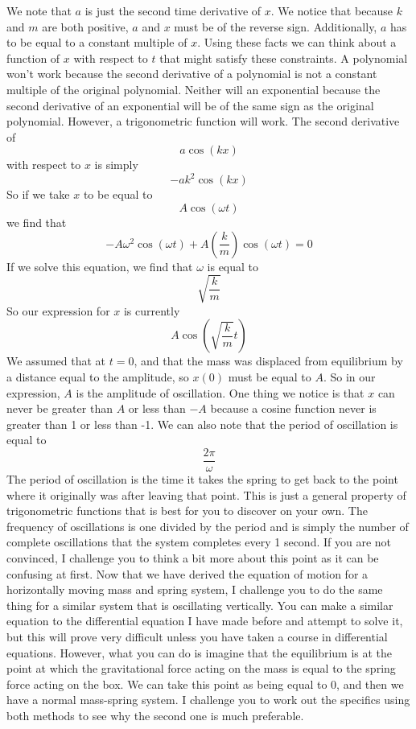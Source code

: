 \documentclass{article}[gray]
\numberwithin{equation}{subsection}
\begin{document}
We note that $a$ is just the second time derivative of $x$. We notice that because $k$ and $m$ are both positive, $a$ and $x$ must be of the reverse sign. Additionally, $a$ has to be equal to a constant multiple of $x$. Using these facts we can think about a function of $x$ with respect to $t$ that might satisfy these constraints. A polynomial won’t work because the second derivative of a polynomial is not a constant multiple of the original polynomial. Neither will an exponential because the second derivative of an exponential will be of the same sign as the original polynomial. However, a trigonometric function will work. The second derivative of $$a\cos\left(kx\right)$$ with respect to $x$ is simply $$-ak^2\cos\left(kx\right)$$ So if we take $x$ to be equal to $$A\cos\left(\omega t \right)$$ we find that $$-A\omega^2\cos\left(\omega t \right)+A\left(\frac{k}{m}\right)\cos\left(\omega t \right)=0$$ If we solve this equation, we find that $\omega$ is equal to $$\sqrt{\frac{k}{m}}$$ So our expression for $x$ is currently $$A\cos\left(\sqrt{\frac{k}{m}}t\right)$$ We assumed that at $t = 0$, and that the mass was displaced from equilibrium by a distance equal to the amplitude, so $x\left(0\right)$ must be equal to $A$. So in our expression, $A$ is the amplitude of oscillation. One thing we notice is that $x$ can never be greater than $A$ or less than $-A$ because a cosine function never is greater than 1 or less than -1. We can also note that the period of oscillation is equal to $$\frac{2\pi}{\omega}$$ The period of oscillation is the time it takes the spring to get back to the point where it originally was after leaving that point. This is just a general property of trigonometric functions that is best for you to discover on your own.  The frequency of oscillations is one divided by the period and is simply the number of complete oscillations that the system completes every 1 second. If you are not convinced, I challenge you to think a bit more about this point as it can be confusing at first. 
Now that we have derived the equation of motion for a horizontally moving mass and spring system, I challenge you to do the same thing for a similar system that is oscillating vertically. You can make a similar equation to the differential equation I have made before and attempt to solve it, but this will prove very difficult unless you have taken a course in differential equations. However, what you can do is imagine that the equilibrium is at the point at which the gravitational force acting on the mass is equal to the spring force acting on the box. We can take this point as being equal to 0, and then we have a normal mass-spring system. I challenge you to work out the specifics using both methods to see why the second one is much preferable.  
\end{document}

